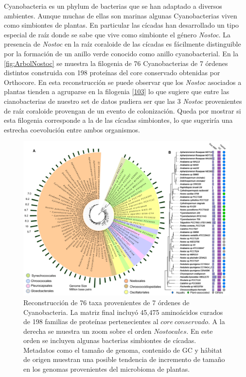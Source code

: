 \documentclass[12pt,twoside]{reedthesis}
\begin{document}
  Cyanobacteria es un phylum de bacterias que se han adaptado a diversos
  ambientes. Aunque muchas de ellas son marinas algunas Cyanobacterias
  viven como simbiontes de plantas. En particular las cícadas han
  desarrollado un tipo especial de raíz donde se sabe que vive como
  simbionte el género \emph{Nostoc}. La presencia de \emph{Nostoc} en la
  raíz coraloide de las cícadas es fácilmente distinguible por la
  formación de un anillo verde conocido como anillo cyanobacterial. En la
  \autoref{fig:ArbolNostoc} se muestra la filogenia de 76 Cyanobacterias
  de 7 órdenes distintos construida con 198 proteínas del core conservado
  obtenidas por Orthocore. En esta reconstrucción se puede observar que
  los \emph{Nostoc} asociados a plantas tienden a agruparse en la
  filogenia {[}\protect\hyperlink{ref-gutierrez-garcia_cycad_2019}{103}{]}
  lo que sugiere que entre las cianobacterias de nuestro set de datos
  pudiera ser que las 3 \emph{Nostoc} provenientes de raíz coraloide
  provengan de un evento de colonización. Queda por mostrar si esta
  filogenia corresponde a la de las cícadas simbiontes, lo que sugeriría
  una estrecha coevolución entre ambos organismos.
  
  \begin{figure}[h!tbp]
  \centering
  \includegraphics[angle = 0,scale = .45]{chapter1/Nostoc.png}
  \caption[Arbol filogenético de $Nostoc$ construido utilizando  la selección de genes del $core~conservado$]{\footnotesize{Reconstrucción de 76 taxa provenientes de 7 órdenes de Cyanobacteria. La matriz final incluyó 45,475 aminoácidos curados de 198 familias de proteínas pertenecientes al $core~conservado$. A la derecha se muestra un zoom sobre el orden $Nostocales$. En este orden se incluyen algunas bacterias simbiontes de cícadas. Metadatos como el tamaño de genoma, contenido de GC y hábitat de origen muestran una posible tendencia de incremento de tamaño en los genomas provenientes del microbioma de plantas.}}
  \label{fig:ArbolNostoc}
  \end{figure}
  
\end{document}
